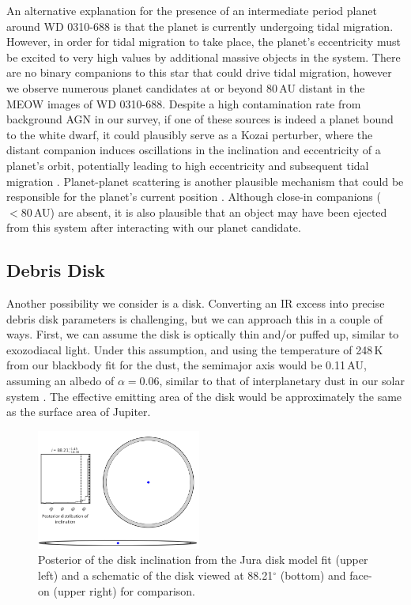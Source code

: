 \documentclass[twocolumn]{aastex631}
\begin{document}
\begin{itemize}
    An alternative explanation for the presence of an intermediate period planet around WD 0310-688 is that the planet is currently undergoing tidal migration. However, in order for tidal migration to take place, the planet's eccentricity must be excited to very high values by additional massive objects in the system. There are no binary companions to this star that could drive tidal migration, however we observe numerous planet candidates at or beyond 80\,AU  distant in the MEOW images of WD 0310-688. Despite a high contamination rate from background AGN in our survey, if one of these sources is indeed a planet bound to the white dwarf, it could plausibly serve as a Kozai perturber, where the distant companion induces oscillations in the inclination and eccentricity of a planet's orbit, potentially leading to high eccentricity and subsequent tidal migration \citep{2020ApJ...904L...3M,2021ApJ...922....4S}.
    Planet-planet scattering is another plausible mechanism that could be responsible for the planet's current position \citep{2012ApJ...747..148D,2016MNRAS.458.3942V,2021MNRAS.501L..43M,2022MNRAS.512..104M}. Although close-in companions ($<80$\,AU) are absent, it is also plausible that an object may have been ejected from this system after interacting with our planet candidate. 
\end{itemize}

\subsection{Debris Disk}
Another possibility we consider is a disk. Converting an IR excess into precise debris disk parameters is challenging, but we can approach this in a couple of ways. First, we can assume the disk is optically thin and/or puffed up, similar to exozodiacal light. Under this assumption, and using the temperature of 248\,K from our blackbody fit for the dust, the semimajor axis would be 0.11\,AU, assuming an albedo of $\alpha = 0.06$, similar to that of interplanetary dust in our solar system \citep{2015ApJ...813...87Y}. The effective emitting area of the disk would be approximately the same as the surface area of Jupiter.



\begin{figure}[b]
\centering
\includegraphics[width=0.48\textwidth]{Figures/diskPic.pdf}
\caption{Posterior of the disk inclination from the Jura disk model fit (upper left) and a schematic of the disk viewed at 88.21$^\circ$ (bottom) and face-on (upper right) for comparison.}
\label{DiskModel}
\end{figure}
\end{document}
